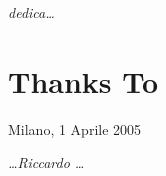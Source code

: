 \begin{flushright}
\Large\textit{dedica\dots}
\end{flushright}


\cleardoublepage

\thispagestyle{empty}

\chapter*{Thanks To}

\begin{flushleft}
Milano, 1 Aprile 2005
\end{flushleft}

\begin{flushright}
\emph{\dots Riccardo \dots}
\end{flushright}

\cleardoublepage
\thispagestyle{empty}